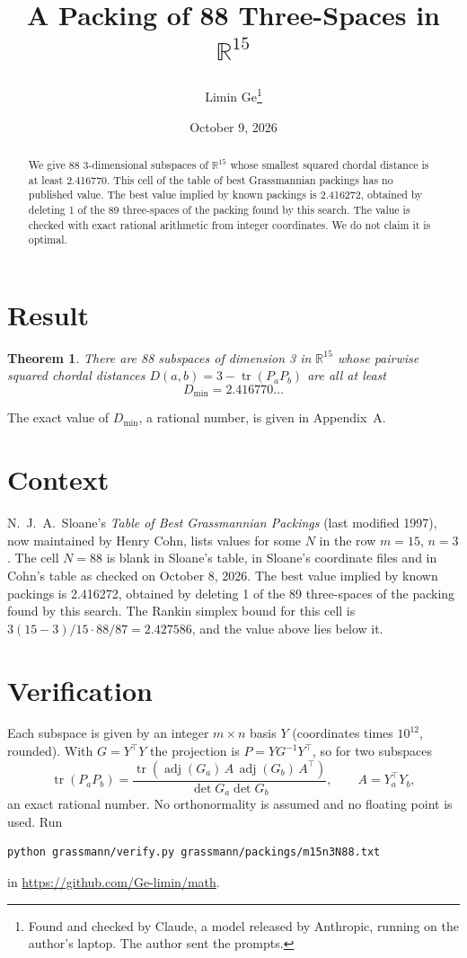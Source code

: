 \documentclass[11pt,a4paper]{article}
\title{A Packing of 88 Three-Spaces in $\mathbb{R}^{15}$}
\author{Limin Ge\thanks{Found and checked by Claude, a model released by Anthropic, running on the author's laptop. The author sent the prompts.}}
\date{October 9, 2026}
\newtheorem*{theorem}{Theorem}
\begin{document}
\maketitle
\begin{abstract}
We give 88 3-dimensional subspaces of $\mathbb{R}^{15}$ whose smallest squared chordal distance is at least 2.416770. This cell of the table of best Grassmannian packings has no published value. The best value implied by known packings is 2.416272, obtained by deleting 1 of the 89 three-spaces of the packing found by this search. The value is checked with exact rational arithmetic from integer coordinates. We do not claim it is optimal.
\end{abstract}

\section{Result}
\begin{theorem}
There are 88 subspaces of dimension 3 in $\mathbb{R}^{15}$ whose pairwise squared chordal distances $D(a,b) = 3 - \operatorname{tr}(P_aP_b)$ are all at least
\[ D_{\min} = 2.416770\ldots \]
\end{theorem}
The exact value of $D_{\min}$, a rational number, is given in Appendix~A.


\section{Context}
N.~J.~A.~Sloane's \emph{Table of Best Grassmannian Packings} (last modified 1997), now maintained by Henry Cohn, lists values for some $N$ in the row $m=15$, $n=3$. The cell $N=88$ is blank in Sloane's table, in Sloane's coordinate files and in Cohn's table as checked on October 8, 2026. The best value implied by known packings is 2.416272, obtained by deleting 1 of the 89 three-spaces of the packing found by this search. The Rankin simplex bound for this cell is $3(15-3)/15\cdot 88/87 = 2.427586$, and the value above lies below it.


\section{Verification}
Each subspace is given by an integer $m\times n$ basis $Y$ (coordinates times $10^{12}$, rounded). With $G=Y^\top Y$ the projection is $P=YG^{-1}Y^\top$, so for two subspaces
\[ \operatorname{tr}(P_aP_b)=\frac{\operatorname{tr}(\operatorname{adj}(G_a)\,A\,\operatorname{adj}(G_b)\,A^\top)}{\det G_a\det G_b},\qquad A=Y_a^\top Y_b, \]
an exact rational number. No orthonormality is assumed and no floating point is used. Run
\begin{verbatim}
python grassmann/verify.py grassmann/packings/m15n3N88.txt
\end{verbatim}
in \url{https://github.com/Ge-limin/math}.
\end{document}
